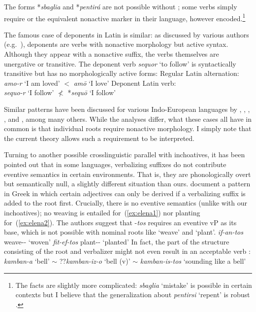 {The forms *\emph{sbaglia} and *\emph{pentir\'a} are not possible without ; some verbs simply require  or the equivalent nonactive marker in their language, however encoded.\footnote{The facts are slightly more complicated: \emph{sbaglia} `mistake' is possible in certain contexts but I believe that the generalization about \emph{pentirsi} `repent' is robust \citep[40]{burzio86}.}

The famous case of deponents in Latin is similar: as discussed by various authors (e.g.~\citealt{xuetal07}), deponents are verbs with nonactive morphology but active syntax. Although they appear with a nonactive suffix, the verbs themselves are unergative or transitive. The deponent verb \emph{sequor} `to follow' is syntactically transitive but has no morphologically active forms:
\pex
    \a Regular Latin alternation:\\
        \emph{amo-r} `I am loved' $<$ \emph{am\=o} `I love'
    \a Deponent Latin verb:\\
        \emph{sequo-r} `I follow' $\nless$ *\emph{sequ\=o} `I follow'
\xe

Similar patterns have been discussed for various Indo-European languages by \cite{aronoff94}, \cite{embick04}, \cite{kallulli13}, \cite{wood15springer}, \cite{kastnerzu17} and \cite{grestenberger18}, among many others. While the analyses differ, what these cases all have in common is that individual roots require nonactive morphology. I simply note that the current theory allows such a requirement to be interpreted.

Turning to another possible crosslinguistic parallel with inchoatives, it has been pointed out that in some languages, verbalizing suffixes do not contribute eventive semantics in certain environments. That is, they are phonologically overt but semantically null, a slightly different situation than ours. \citet{elenasamioti13,elenasamioti14} document a pattern in Greek in which certain adjectives can only be derived if a verbalizing suffix is added to the root first. Crucially, there is no eventive semantics (unlike with our inchoatives); no weaving is entailed for~(\ref{ex:elena1}) nor planting for~(\ref{ex:elena2}). {The authors suggest that -\emph{tos} requires an eventive vP as its base, which is not possible with nominal roots like `weave' and `plant'.}
\ex \label{ex:elena1} \emph{if-an-tos} weave-- `woven'
\xe
\ex \label{ex:elena2} \emph{fit-ef-tos} plant-- `planted' \hfill \citep[97]{elenasamioti14}
\xe
In fact, the part of the structure consisting of the root and verbalizer might not even result in an acceptable verb \citep[100]{elenasamioti14}:
\ex \emph{kamban-a} `bell' $\sim$ ??\emph{kamban-iz-o} `bell (v)' $\sim$ \emph{kamban-is-tos} `sounding like a bell'
\xe

}
